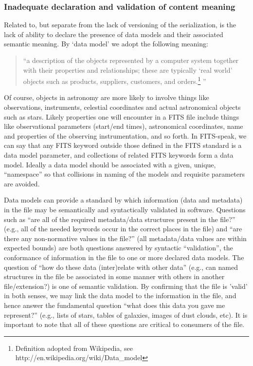 \documentclass[final,authoryear,5p,times,twocolumn]{elsarticle}
\begin{document}
{{\subsubsection{Inadequate declaration and validation of content meaning}


Related to, but separate from the lack of versioning of the
serialization, is the lack of ability to declare the presence of data
models and their associated semantic meaning.  By `data model' we
adopt the following meaning:


\begin{quote}
``a description of the objects represented by a computer system
together with their properties and relationships; these are typically
`real world' objects such as products, suppliers, customers, and
orders.\footnote{Definition adopted from Wikipedia, see http://en.wikipedia.org/wiki/Data\_model}
''
\end{quote}


Of course, objects in astronomy are more likely to involve things like
observations, instruments, celestial coordinates and actual astronomical
objects such as stars. Likely properties one will encounter in a FITS
file include things like observational parameters (start/end times),
astronomical coordinates, name and properties of the observing
instrumentation, and so forth. In FITS-speak, we can say that any FITS
keyword outside those defined in the FITS standard is a data model
parameter, and collections of related FITS keywords form a data model.
Ideally a data model should be associated with a given, unique,
``namespace'' so that collisions in naming of the models and requisite
parameters are avoided.


Data models can provide a standard by which information (data and metadata)
in the file may be semantically and syntactically validated in software.
Questions such as ``are all of the required metadata/data structures present
in the file?'' (e.g., all of
the needed keywords occur in the correct places in the file) and ``are
there any non-normative values in the file?'' (all metadata/data values
are within expected bounds) are both questions answered by syntactic
``validation'', the conformance of information in the file to one or more
declared data models.  The question of ``how do these data (inter)relate
with other data'' (e.g., can named structures in the file be associated
in some manner with others in another file/extension?) is one of semantic
validation. By confirming that the file is 'valid' in both senses, we may
link the data model to the information in the file, and hence answer the
fundamental question ``what does this data you gave me represent?'' (e.g., lists
of stars, tables of galaxies, images of dust clouds, etc).
It is important to note that all of these questions are critical to
consumers of the file.


}}
\end{document}
